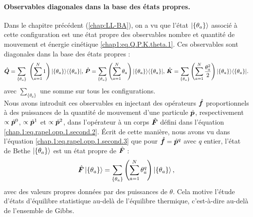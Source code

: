 \begin{mdframed}[
	linewidth=0.5pt, 
	backgroundcolor=gray!5, 
	roundcorner=50pt,	
	innerleftmargin=5pt,
    innerrightmargin=5pt,
    innertopmargin=-10pt,
    innerbottommargin=2pt,
    leftmargin=2pt,
    rightmargin=2pt
	]
\paragraph{Observables diagonales dans la base des états propres.}
Dans le chapitre précédent (\ref{chap:LL-BA}), on a vu que l'état $\ket{\{ \theta_a \}}$ associé à cette configuration est une état propre des observables nombre et quantité de mouvement  et  énergie cinétique \eqref{chap1:eq.Q.P.K.theta.1}. Ces observables sont diagonales dans la base des états propres :
\begin{eqnarray}
	\operator{Q}  =  \sum_{ \{\theta_a\} } \left ( \sum_{a = 1}^{N}  1 \right )  \vert \{ \theta_a\}\rangle	\langle \{ \theta_a \}\vert, \, 
	\operator{P}  =  \sum_{\{ \theta_a\}}\left( \sum_{a = 1}^{N}  \theta_a \right )   \vert \{ \theta_a\}\rangle	\langle \{ \theta_a \}\vert,\,\operator{K}  =  \sum_{\{ \theta_a\}}\left ( \sum_{a = 1}^{N} \frac{\theta_a^2}{2} \right )   \vert \{ \theta_a\}\rangle	\langle \{ \theta_a \}\vert.\label{chap.2.gge.1}		
\end{eqnarray}
avec $ \sum_{\{ \theta_a\}}$ une somme sur tous les configurations.\\

Nous avons introduit ces observables en injectant des opérateurs $\hat{\bm{f}}$ proportionnels à des puissances de la quantité de mouvement d’une particule $\hat{\bm{p}}$, respectivement $\propto \hat{\bm{p}}^0$, $\propto \hat{\bm{p}}^1$ et $\propto \hat{\bm{p}}^2$, dans l’opérateur à un corps $\hat{\bm{F}}$ défini dans l’équation \eqref{chap.1:eq.rapel.opp.1.second.2}. Écrit de cette manière, nous avons vu dans l’équation \eqref{chap.1:eq.rapel.opp.1.second.3} que pour $\hat{\bm{f}} = \hat{\bm{p}}^q$ avec $q$ entier, l’état de Bethe $\ket{\{ \theta_a \} }$ est un état propre de $\hat{\bm{F}}$ :
\begin{eqnarray}\label{chap.2:eq.rapel.opp.1.second.1}
	 \hat{\bm{F}} \ket{\{\theta_a\}} =   \sum_{ \{\theta_a\} }\left( \sum_{a = 1}^N \theta_a^q \right) \ket{\{\theta_a\}},
\end{eqnarray}
avec des valeurs propres données par des puissances de $\theta$. Cela motive l’étude d’états d’équilibre statistique au-delà de l’équilibre thermique, c’est-à-dire au-delà de l’ensemble de Gibbs.
\end{mdframed}   




